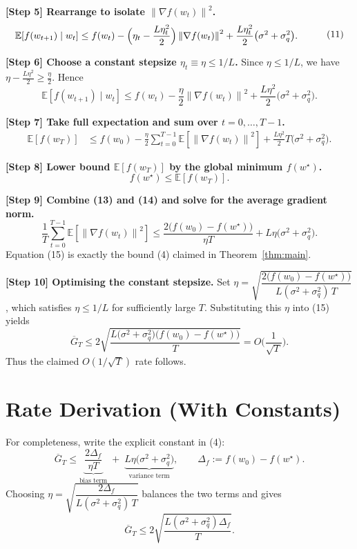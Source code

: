 \documentclass{article}
\newcommand{\E}{\mathbb{E}}
\newcommand{\norm}[1]{\left\lVert #1\right\rVert}
\begin{document}
\bigskip
\noindent\textbf{[Step 5] Rearrange to isolate $\norm{\nabla f(w_t)}^{2}$.}
\[
\begin{aligned}
\E\!\left[f(w_{t+1})\mid w_t\right]
&\le f(w_t)-\Bigl(\eta_t-\frac{L\eta_t^{2}}{2}\Bigr)\norm{\nabla f(w_t)}^{2}
+\frac{L\eta_t^{2}}{2}\bigl(\sigma^{2}+\sigma_q^{2}\bigr).
\end{aligned}
\tag{11}
\]

\bigskip
\noindent\textbf{[Step 6] Choose a constant stepsize $\eta_t\equiv\eta\le 1/L$.}  
Since $\eta\le 1/L$, we have $\eta-\frac{L\eta^{2}}{2}\ge \frac{\eta}{2}$.  Hence
\[
\E\!\left[f(w_{t+1})\mid w_t\right]
\le f(w_t)-\frac{\eta}{2}\norm{\nabla f(w_t)}^{2}
+\frac{L\eta^{2}}{2}\bigl(\sigma^{2}+\sigma_q^{2}\bigr).
\tag{12}
\]

\bigskip
\noindent\textbf{[Step 7] Take full expectation and sum over $t=0,\dots,T-1$.}
\[
\begin{aligned}
\E[f(w_T)] 
&\le f(w_0)-\frac{\eta}{2}\sum_{t=0}^{T-1}\E\!\left[\norm{\nabla f(w_t)}^{2}\right]
+ \frac{L\eta^{2}}{2}T\bigl(\sigma^{2}+\sigma_q^{2}\bigr).
\end{aligned}
\tag{13}
\]

\bigskip
\noindent\textbf{[Step 8] Lower bound $\E[f(w_T)]$ by the global minimum $f(w^{\star})$.}
\[
f(w^{\star})\le \E[f(w_T)].
\tag{14}
\]

\bigskip
\noindent\textbf{[Step 9] Combine (13) and (14) and solve for the average gradient norm.}
\[
\frac{1}{T}\sum_{t=0}^{T-1}\E\!\left[\norm{\nabla f(w_t)}^{2}\right]
\le \frac{2\bigl(f(w_0)-f(w^{\star})\bigr)}{\eta T}
+ L\eta\bigl(\sigma^{2}+\sigma_q^{2}\bigr).
\tag{15}
\]
Equation (15) is exactly the bound (4) claimed in Theorem~\ref{thm:main}.

\bigskip
\noindent\textbf{[Step 10] Optimising the constant stepsize.}  
Set $\eta = \sqrt{\dfrac{2\bigl(f(w_0)-f(w^{\star})\bigr)}{L(\sigma^{2}+\sigma_q^{2})\,T}}$, which satisfies $\eta\le 1/L$ for sufficiently large $T$. Substituting this $\eta$ into (15) yields
\[
\overline{G}_T \le
2\sqrt{\frac{L\bigl(\sigma^{2}+\sigma_q^{2}\bigr)\bigl(f(w_0)-f(w^{\star})\bigr)}{T}}
= O\!\Big(\frac{1}{\sqrt{T}}\Big).
\tag{16}
\]
Thus the claimed $O(1/\sqrt{T})$ rate follows.

\section*{Rate Derivation (With Constants)}
For completeness, write the explicit constant in (4):
\[
\overline{G}_T
\le
\underbrace{\frac{2\Delta_f}{\eta T}}_{\text{bias term}}
\;+\;
\underbrace{L\eta\bigl(\sigma^{2}+\sigma_q^{2}\bigr)}_{\text{variance term}},
\qquad
\Delta_f:=f(w_0)-f(w^{\star}).
\]
Choosing $\eta = \sqrt{\dfrac{2\Delta_f}{L(\sigma^{2}+\sigma_q^{2})\,T}}$ balances the two terms and gives
\[
\overline{G}_T \le 2\sqrt{\frac{L(\sigma^{2}+\sigma_q^{2})\Delta_f}{T}}.
\]
\end{document}
